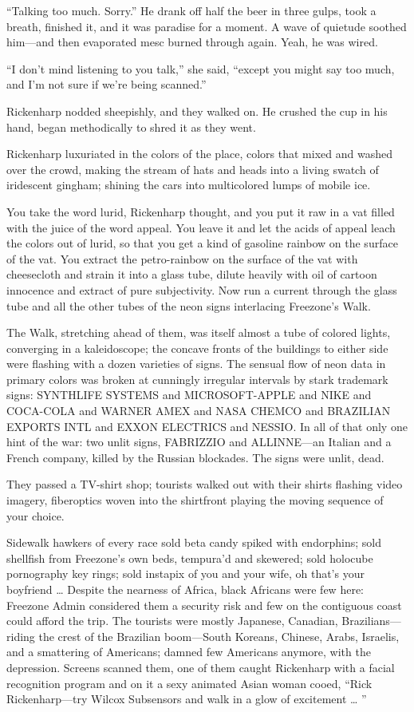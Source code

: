“Talking too much. Sorry.” He drank off half the beer in three gulps, took a breath, finished it, and it was paradise for a moment. A wave of quietude soothed him—and then evaporated mesc burned through again. Yeah, he was wired.

“I don’t mind listening to you talk,” she said, “except you might say too much, and I’m not sure if we’re being scanned.”

Rickenharp nodded sheepishly, and they walked on. He crushed the cup in his hand, began methodically to shred it as they went.

Rickenharp luxuriated in the colors of the place, colors that mixed and washed over the crowd, making the stream of hats and heads into a living swatch of iridescent gingham; shining the cars into multicolored lumps of mobile ice.

You take the word lurid, Rickenharp thought, and you put it raw in a vat filled with the juice of the word appeal. You leave it and let the acids of appeal leach the colors out of lurid, so that you get a kind of gasoline rainbow on the surface of the vat. You extract the petro-rainbow on the surface of the vat with cheesecloth and strain it into a glass tube, dilute heavily with oil of cartoon innocence and extract of pure subjectivity. Now run a current through the glass tube and all the other tubes of the neon signs interlacing Freezone’s Walk.

The Walk, stretching ahead of them, was itself almost a tube of colored lights, converging in a kaleidoscope; the concave fronts of the buildings to either side were flashing with a dozen varieties of signs. The sensual flow of neon data in primary colors was broken at cunningly irregular intervals by stark trademark signs: SYNTHLIFE SYSTEMS and MICROSOFT-APPLE and NIKE and COCA-COLA and WARNER AMEX and NASA CHEMCO and BRAZILIAN EXPORTS INTL and EXXON ELECTRICS and NESSIO. In all of that only one hint of the war: two unlit signs, FABRIZZIO and ALLINNE—an Italian and a French company, killed by the Russian blockades. The signs were unlit, dead.

They passed a TV-shirt shop; tourists walked out with their shirts flashing video imagery, fiberoptics woven into the shirtfront playing the moving sequence of your choice.

Sidewalk hawkers of every race sold beta candy spiked with endorphins; sold shellfish from Freezone’s own beds, tempura’d and skewered; sold holocube pornography key rings; sold instapix of you and your wife, oh that’s your boyfriend … Despite the nearness of Africa, black Africans were few here: Freezone Admin considered them a security risk and few on the contiguous coast could afford the trip. The tourists were mostly Japanese, Canadian, Brazilians—riding the crest of the Brazilian boom—South Koreans, Chinese, Arabs, Israelis, and a smattering of Americans; damned few Americans anymore, with the depression. Screens scanned them, one of them caught Rickenharp with a facial recognition program and on it a sexy animated Asian woman cooed, “Rick Rickenharp—try Wilcox Subsensors and walk in a glow of excitement … ”

